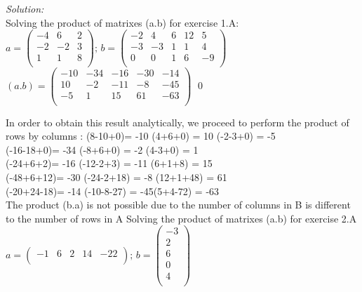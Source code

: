 \documentclass[12pt]{article}
\newenvironment{sol}
    {\emph{Solution:}
    }
    {
    \qed
    }
\begin{document}
\begin{sol}\\
Solving the product of matrixes (a.b) for exercise 1.A:
\vfill
$a = \left(
\begin{array}{ccc}
 -4 & 6 & 2 \\
 -2 & -2 & 3 \\
 1 & 1 & 8 \\
\end{array}
\right) \text{; } b = \left(
\begin{array}{ccccc}
 -2 & 4 & 6 & 12 & 5 \\
 -3 & -3 & 1 & 1 & 4 \\
 0 & 0 & 1 & 6 & -9 \\
\end{array}
\right)$
\vfill
$(a.b) =\left(
\begin{array}
{ccccc}
 -10 & -34 & -16 & -30 & -14 \\
 10 & -2 & -11 & -8 & -45 \\
 -5 & 1 & 15 & 61 & -63 \\
\end{array}
\right) 
$\end{sol} \vfill

In order to obtain this result analytically, we proceed to perform the product of rows by columns : 
\vfill
(8-10+0)= -10 \thinspace (4+6+0) = 10 \thinspace   (-2-3+0) = -5 
\\ \vfill
(-16-18+0)= -34 \thinspace (-8+6+0) = -2  \thinspace   (4-3+0) = 1
\\ \vfill
(-24+6+2)= -16 \thinspace (-12-2+3) = -11  \thinspace   (6+1+8) = 15
\\ \vfill
(-48+6+12)= -30 \thinspace (-24-2+18) = -8 \thinspace (12+1+48) = 61
\\ \vfill
(-20+24-18)= -14 \thinspace (-10-8-27) = -45\thinspace(5+4-72) = -63
 \\ \vfill
The product (b.a) is not possible due to the number of columns in B is different to the number of rows in A 
\vfill
Solving the product of matrixes (a.b) for exercise 2.A
\vfill
$a= \left(
\begin{array}{ccccc}
 -1 & 6 & 2 & 14 & -22 \\
\end{array}
\right) \text{; } b =\left(
\begin{array}{c}
 -3 \\
 2 \\
 6 \\
 0 \\
 4 \\
\end{array}
\right)$ \\
\end{document}
